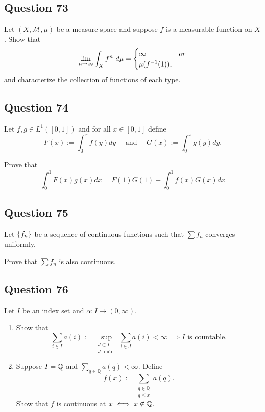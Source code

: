 \documentclass[12pt]{article}
\begin{document}
\hypertarget{question-73-1}{%
\subsection{Question 73}\label{question-73-1}}

Let \((X, \mathcal M, \mu)\) be a measure space and suppose \(f\) is a
measurable function on \(X\). Show that \[
\lim _{n \rightarrow \infty} \int_{X} f^{n} ~d \mu =
\begin{cases}
\infty & or \\
\mu(f^{-1}(1)),
\end{cases}
\] and characterize the collection of functions of each type.

\hypertarget{question-74-1}{%
\subsection{Question 74}\label{question-74-1}}

Let \(f, g \in L^1([0, 1])\) and for all \(x\in [0, 1]\) define \[
F(x):=\int_{0}^{x} f(y) d y \quad \text { and } \quad G(x):=\int_{0}^{x} g(y) d y.
\]

Prove that \[
\int_{0}^{1} F(x) g(x) d x=F(1) G(1)-\int_{0}^{1} f(x) G(x) d x
\]

\hypertarget{question-75-1}{%
\subsection{Question 75}\label{question-75-1}}

Let \(\left\{{f_n}\right\}\) be a sequence of continuous functions such that
\(\sum f_n\) converges uniformly.

Prove that \(\sum f_n\) is also continuous.

\hypertarget{question-76-1}{%
\subsection{Question 76}\label{question-76-1}}

Let \(I\) be an index set and \(\alpha: I \to (0, \infty)\).

\begin{enumerate}
\def\labelenumi{\arabic{enumi}.}
\item
  Show that \[
  \sum_{i \in I} a(i):=\sup _{\substack{ J \subset I \\ J \text { finite }}} \sum_{i \in J} a(i)<\infty \implies I \text{ is countable.}
  \]
\item
  Suppose \(I = {\mathbb{Q}}\) and \(\sum_{q \in \mathbb{Q}} a(q)<\infty\).
  Define \[
  f(x):=\sum_{\substack{q \in \mathbb{Q}\\ q \leq x}} a(q).
  \] Show that \(f\) is continuous at \(x \iff x\not\in {\mathbb{Q}}\).
\end{enumerate}
\end{document}
